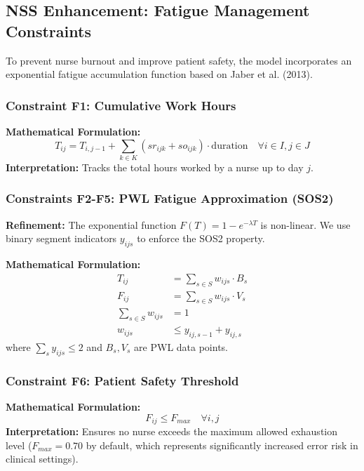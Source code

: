 \documentclass[12pt,a4paper]{article}
\begin{document}
\subsection{NSS Enhancement: Fatigue Management Constraints}

To prevent nurse burnout and improve patient safety, the model incorporates an exponential fatigue accumulation function based on Jaber et al. (2013).

\subsubsection{Constraint F1: Cumulative Work Hours}
\begin{tcolorbox}[title=Constraint F1: Work Hour Accumulation]
\textbf{Mathematical Formulation:}
\begin{equation}
T_{ij} = T_{i,j-1} + \sum_{k \in K} (sr_{ijk} + so_{ijk}) \cdot \text{duration} \quad \forall i \in I, j \in J
\end{equation}
\textbf{Interpretation:} Tracks the total hours worked by a nurse up to day $j$.
\end{tcolorbox}

\subsubsection{Constraints F2-F5: PWL Fatigue Approximation (SOS2)}
\begin{tcolorbox}[title=Fatigue Approximation with Binary indicators]
\textbf{Refinement:} The exponential function $F(T) = 1 - e^{-\lambda T}$ is non-linear. We use binary segment indicators $y_{ijs}$ to enforce the SOS2 property.

\textbf{Mathematical Formulation:}
\begin{align}
T_{ij} &= \sum_{s \in S} w_{ijs} \cdot B_s \tag{F2: Abscissa} \\
F_{ij} &= \sum_{s \in S} w_{ijs} \cdot V_s \tag{F3: Ordinate} \\
\sum_{s \in S} w_{ijs} &= 1 \tag{F4: Convexity} \\
w_{ijs} &\leq y_{ij,s-1} + y_{ij,s} \tag{F5: SOS2 Link}
\end{align}
where $\sum_s y_{ijs} \leq 2$ and $B_s, V_s$ are PWL data points.
\end{tcolorbox}

\subsubsection{Constraint F6: Patient Safety Threshold}
\begin{tcolorbox}[title=Constraint F6: Fatigue Ceiling]
\textbf{Mathematical Formulation:}
\begin{equation}
F_{ij} \leq F_{max} \quad \forall i, j
\end{equation}
\textbf{Interpretation:} Ensures no nurse exceeds the maximum allowed exhaustion level ($F_{max}=0.70$ by default, which represents significantly increased error risk in clinical settings).
\end{tcolorbox}
\end{document}
